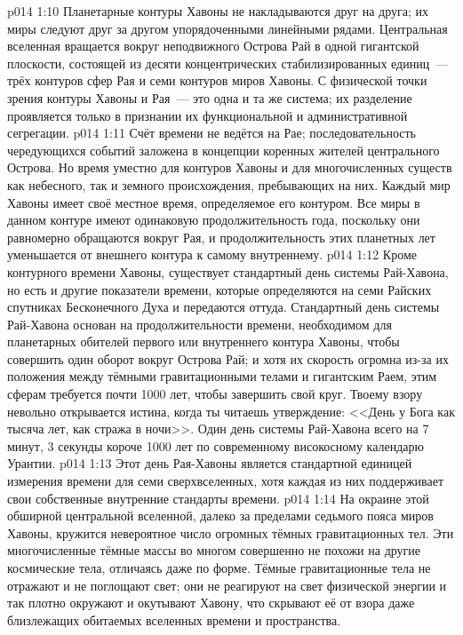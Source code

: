 \vs p014 1:10 Планетарные контуры Хавоны не накладываются друг на друга; их миры следуют друг за другом упорядоченными линейными рядами. Центральная вселенная вращается вокруг неподвижного Острова Рай в одной гигантской плоскости, состоящей из десяти концентрических стабилизированных единиц~--- трёх контуров сфер Рая и семи контуров миров Хавоны. С физической точки зрения контуры Хавоны и Рая~--- это одна и та же система; их разделение проявляется только в признании их функциональной и административной сегрегации.
\vs p014 1:11 \pc Счёт времени не ведётся на Рае; последовательность чередующихся событий заложена в концепции коренных жителей центрального Острова. Но время уместно для контуров Хавоны и для многочисленных существ как небесного, так и земного происхождения, пребывающих на них. Каждый мир Хавоны имеет своё местное время, определяемое его контуром. Все миры в данном контуре имеют одинаковую продолжительность года, поскольку они равномерно обращаются вокруг Рая, и продолжительность этих планетных лет уменьшается от внешнего контура к самому внутреннему.
\vs p014 1:12 Кроме контурного времени Хавоны, существует стандартный день системы Рай\hyp{}Хавона, но есть и другие показатели времени, которые определяются на семи Райских спутниках Бесконечного Духа и передаются оттуда. Стандартный день системы Рай\hyp{}Хавона основан на продолжительности времени, необходимом для планетарных обителей первого или внутреннего контура Хавоны, чтобы совершить один оборот вокруг Острова Рай; и хотя их скорость огромна из\hyp{}за их положения между тёмными гравитационными телами и гигантским Раем, этим сферам требуется почти 1000 лет, чтобы завершить свой круг. Твоему взору невольно открывается истина, когда ты читаешь утверждение: <<День у Бога как тысяча лет, как стража в ночи>>. Один день системы Рай\hyp{}Хавона всего на 7 минут, 3 секунды короче 1000 лет по современному високосному календарю Урантии.
\vs p014 1:13 Этот день Рая\hyp{}Хавоны является стандартной единицей измерения времени для семи сверхвселенных, хотя каждая из них поддерживает свои собственные внутренние стандарты времени.
\vs p014 1:14 \pc На окраине этой обширной центральной вселенной, далеко за пределами седьмого пояса миров Хавоны, кружится невероятное число огромных тёмных гравитационных тел. Эти многочисленные тёмные массы во многом совершенно не похожи на другие космические тела, отличаясь даже по форме. Тёмные гравитационные тела не отражают и не поглощают свет; они не реагируют на свет физической энергии и так плотно окружают и окутывают Хавону, что скрывают её от взора даже близлежащих обитаемых вселенных времени и пространства.
